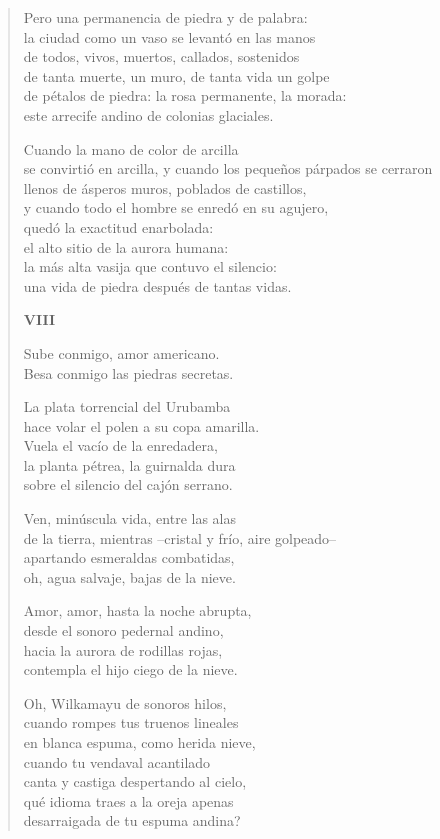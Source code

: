 \documentclass[12pt]{article}
\begin{document}
\begin{verse}
Pero una permanencia de piedra y de palabra:\\
la ciudad como un vaso se levantó en las manos\\
de todos, vivos, muertos, callados, sostenidos\\
de tanta muerte, un muro, de tanta vida un golpe\\
de pétalos de piedra: la rosa permanente, la morada:\\
este arrecife andino de colonias glaciales.  

Cuando la mano de color de arcilla\\
se convirtió en arcilla, y cuando los pequeños párpados se cerraron\\
llenos de ásperos muros, poblados de castillos,\\
y cuando todo el hombre se enredó en su agujero,\\
quedó la exactitud enarbolada:\\
el alto sitio de la aurora humana:\\
la más alta vasija que contuvo el silencio:\\
una vida de piedra después de tantas vidas.  

{\bfseries\scshape {VIII}}

Sube conmigo, amor americano.\\
Besa conmigo las piedras secretas.  

La plata torrencial del Urubamba\\
hace volar el polen a su copa amarilla.\\
Vuela el vacío de la enredadera,\\
la planta pétrea, la guirnalda dura\\
sobre el silencio del cajón serrano.  

Ven, minúscula vida, entre las alas\\
de la tierra, mientras --cristal y frío, aire golpeado--\\
apartando esmeraldas combatidas,\\
oh, agua salvaje, bajas de la nieve.  

Amor, amor, hasta la noche abrupta,\\
desde el sonoro pedernal andino,\\
hacia la aurora de rodillas rojas,\\
contempla el hijo ciego de la nieve.  

Oh, Wilkamayu de sonoros hilos,\\
cuando rompes tus truenos lineales\\
en blanca espuma, como herida nieve,\\
cuando tu vendaval acantilado\\
canta y castiga despertando al cielo,\\
qué idioma traes a la oreja apenas\\
desarraigada de tu espuma andina?  


\end{verse}
\end{document}
